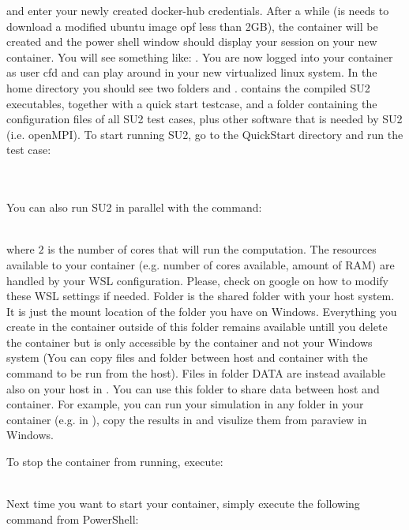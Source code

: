 and enter your newly created docker-hub credentials. 
After a while (is needs to download a modified ubuntu image opf less than 2GB), the container will be created and the power shell window should display your session on your new container. You will see something like: . You are now logged into your container as user cfd and can play around in your new virtualized linux system. In the home directory you should see two folders  and .  contains the compiled SU2 executables, together with a quick start testcase, and a folder containing the configuration files of all SU2 test cases, plus other software that is needed by SU2 (i.e. openMPI).
To start running SU2, go to the QuickStart directory and run the test case:

\\
\\

You can also run SU2 in parallel with the command:

\\

where $2$ is the number of cores that will run the computation. The resources available to your container (e.g. number of cores available, amount of RAM) are handled by your WSL configuration. Please, check on google on how to modify these WSL settings if needed.
Folder  is the shared folder with your host system. It is just the mount location of the  folder you have on Windows. Everything you create in the container outside of this folder remains available untill you delete the container but is only accessible by the container and not your Windows system (You can copy files and folder between host and container with the command   to be run from the host). Files in folder DATA are instead available also on your host in . You can use this folder to share data between host and container. For example, you can run your simulation in any folder in your container (e.g. in ), copy the results in  and visulize them from paraview in Windows.

To stop the container from running, execute:

\\

Next time you want to start your container, simply execute the following command from PowerShell:

